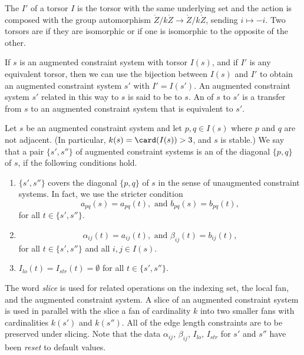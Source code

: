 \begin{definition}
 The  $I'$ of a torsor $I$ is the torsor with the
same underlying set and the action is composed with the group automorphism
$\ring{Z}/k\ring{Z}\to\ring{Z}/k\ring{Z}$, sending $i\mapsto -i$.
Two torsors are  if they are isomorphic or if 
one is isomorphic to the opposite of the other.
\end{definition}

If $s$ is an augmented constraint system with torsor $I(s)$, and if
$I'$ is any equivalent torsor, then we can use the bijection between $I(s)$ and $I'$
to obtain an augmented constraint system $s'$ with $I' = I(s')$.  An
augmented constraint system $s'$ related in this way to $s$ is said
to be  to $s$.  An  of $s$
to $s'$ is a transfer from $s$ to an augmented constraint system that
is equivalent to $s'$.


\begin{definition}[slice]
 Let $s$ be an augmented constraint system and let $p,q\in I(s)$ where $p$ and
  $q$ are not adjacent.  (In particular, $k(s)=\card(I(s))>3$, and $s$ is stable.)  We
  say that a pair $\{s',s''\}$ of augmented constraint systems is an
 of  the
  diagonal $\{p,q\}$ of $s$, if the following conditions hold.
\begin{enumerate}
\item $\{s',s''\}$ covers the diagonal $\{p,q\}$ of $s$ in the sense of unaugmented
constraint systems.  In fact, we use the stricter condition
\[
a_{p q}(s)=a_{p q}(t), \text{ and } b _{p q}(s) = b_{p q}(t),
\]
for all $t\in \{s',s''\}$.
\item
\[
\alpha_{i j}(t) = a_{i j}(t), \text{ and } \beta_{i j}(t) = b_{i j}(t),
\]
for all $t\in\{s',s''\}$ and all $i,j\in I(s)$.
\item
$I_{lo}(t)=I_{str}(t)=\emptyset$ for all  $t\in \{s',s''\}$.
\end{enumerate}
\end{definition}



The word
{\it slice} is used for related operations on the indexing set, the
local fan, and the augmented constraint system.
A slice of an augmented constraint system is used in parallel with the
slice a fan of cardinality $k$ into two smaller fans with
cardinalities $k(s')$ and $k(s'')$.  All of the edge length
constraints are to be preserved under slicing.
Note that the data $\alpha_{ij}$, $\beta_{ij}$, $I_{lo}$, $I_{str}$
for $s'$ and $s''$ have been {\it reset} to default values. 


